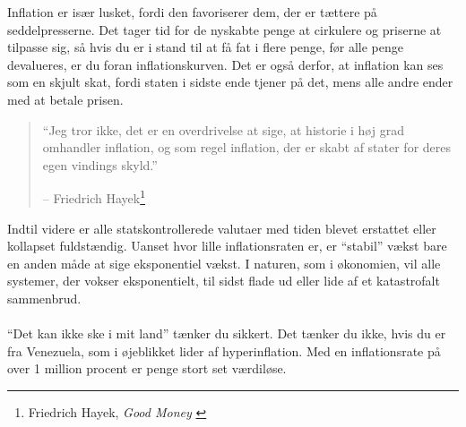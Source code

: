 \documentclass[paper=6in:9in,pagesize=pdftex,headinclude=on,footinclude=on,12pt]{scrbook}
\begin{document}
Inflation er især lusket, fordi den favoriserer dem, der er tættere på seddelpresserne. Det tager tid for de nyskabte penge at cirkulere og priserne at tilpasse sig, så hvis du er i stand til at få fat i flere penge, før alle penge devalueres, er du foran inflationskurven. Det er også derfor, at inflation kan ses som en skjult skat, fordi staten i sidste ende tjener på det, mens alle andre ender med at betale prisen.\begin{quotation}\begin{samepage} \enquote{Jeg tror ikke, det er en overdrivelse at sige, at historie i høj grad omhandler inflation, og som regel inflation, der er skabt af stater for deres egen vindings skyld.} \begin{flushright} -- Friedrich Hayek\footnote{Friedrich Hayek, \textit{Good Money} \cite{hayek-good-money}}
\end{flushright}\end{samepage}\end{quotation}

\newpage

Indtil videre er alle statskontrollerede valutaer med tiden blevet erstattet eller kollapset fuldstændig. Uanset hvor lille inflationsraten er, er \enquote{stabil} vækst bare en anden måde at sige eksponentiel vækst. I naturen, som i økonomien, vil alle systemer, der vokser eksponentielt, til sidst flade ud eller lide af et katastrofalt sammenbrud.\paragraph{} \enquote{Det kan ikke ske i mit land} tænker du sikkert. Det tænker du ikke, hvis du er fra Venezuela, som i øjeblikket lider af hyperinflation. Med en inflationsrate på over 1 million procent er penge stort set værdiløse. \cite{wiki:venezuela}
\end{document}
